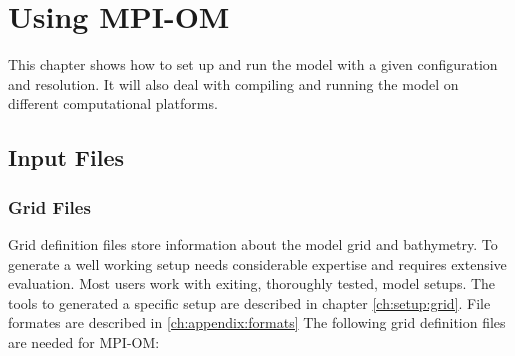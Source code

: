 %
%



\thispagestyle{empty}
 
\chapter[Using MPI-OM]
{\Large{\bf Using MPI-OM}}


This chapter shows how to set up and run the model with a given configuration
and resolution. It will also deal with compiling and running the model on 
different computational platforms.


\section[Input Files]
{\Large{\bf Input Files }}
\label{sec:using:input}

\subsection{Grid Files}

Grid definition files store information about the model grid 
and bathymetry. To generate a well working setup needs considerable 
expertise and requires extensive evaluation.
Most users work with exiting, thoroughly tested, model setups.  
The tools to generated a specific setup are described in chapter \ref{ch:setup:grid}. 
File formates are described in \ref{ch:appendix:formats}
The following grid definition files are needed for MPI-OM:


